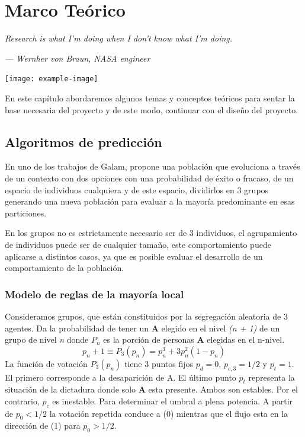 \chapter{Marco Teórico}
\epigraph{\textit{Research is what I'm doing when I don't know what I'm doing.   
	}}{\textit{— Wernher von Braun, NASA engineer}}
	\vspace*{8cm}
	\begin{center}
		\centering
		\texttt{[image: example-image]}
    \end{center}
\thispagestyle{empty}
\newpage
\vspace*{2cm}
En este capítulo abordaremos algunos temas y conceptos teóricos para sentar la base necesaria del proyecto y de este modo, continuar con el diseño del proyecto.

\section{Algoritmos de predicción}
En uno de los trabajos de Galam, propone una población que evoluciona a través de un contexto con dos opciones con una probabilidad de éxito o fracaso, de un espacio de individuos cualquiera y de este espacio, dividirlos en 3 grupos generando una nueva población para evaluar a la mayoría predominante en esas particiones. \cite{Galam2008}

En los grupos no es estrictamente necesario ser de 3 individuos, el agrupamiento de individuos puede ser de cualquier tamaño, este comportamiento puede aplicarse a distintos casos, ya que es posible evaluar el desarrollo de un comportamiento de la población.

\subsection{Modelo de reglas de la mayoría local}
Consideramos grupos, que están constituidos por la segregación aleatoria de 3 agentes. Da la probabilidad de tener un \textbf{A} elegido en el nivel \textit{(n + 1)} de un grupo de nivel \textit{n} donde $P_{n}$ es la porción de personas \textbf{A} elegidas en el n-nivel.\cite{Galam2008}
\begin{equation}
    p_{n}+1 \equiv P_{3}(p_{n}) = p_{n}^3 + 3p_{n}^2(1-p_{n})
\end{equation}
La función de votación $P_{3}(p_{n})$ tiene 3 puntos fijos $p_{d} = 0$, $p_{c,3} = 1/2$ y $p_{t} = 1$. El primero corresponde a la desaparición de A. El último punto $p_{t}$ representa la situación de la dictadura donde solo \textbf{A} esta presente. Ambos son estables. Por el contrario, $p_{c}$ es inestable. Para determinar el umbral a plena potencia. A partir de $p_{0} < 1/2$ la votación repetida conduce a (0) mientras que el flujo esta en la dirección de (1) para $p_{0} > 1/2$.\cite{Galam2008}

